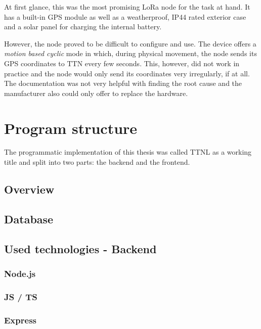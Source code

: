 At first glance, this was the most promising \ac{LoRa} node for the task at hand.
It has a built-in \ac{GPS} module as well as a weatherproof, IP44 rated exterior case and a solar panel for charging the internal battery.

However, the node proved to be difficult to configure and use.
The device offers a \emph{motion based cyclic} mode in which, during physical movement, the node sends its \ac{GPS} coordinates to \ac{TTN} every few seconds.
This, however, did not work in practice and the node would only send its coordinates very irregularly, if at all.
The documentation was not very helpful with finding the root cause and the manufacturer also could only offer to replace the hardware.

\section{Program structure}

The programmatic implementation of this thesis was called \ac{TTNL} as a working title and split into two parts: the backend and the frontend.

\subsection{Overview}


\subsection{Database}


\subsection{Used technologies - Backend}


\subsubsection{Node.js}

\subsubsection{\acf{JS} / \acf{TS}}

\subsubsection{Express}

